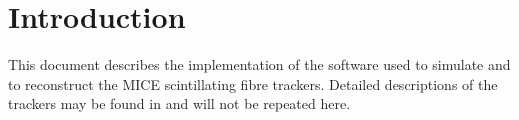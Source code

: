 \section{Introduction}
\label{Sect:Intro}

This document describes the implementation of the software used to
simulate and to reconstruct the MICE scintillating fibre trackers.
Detailed descriptions of the trackers may be found in 
\cite{TRD,TrackerPaper,Theses} and will not be repeated here.
